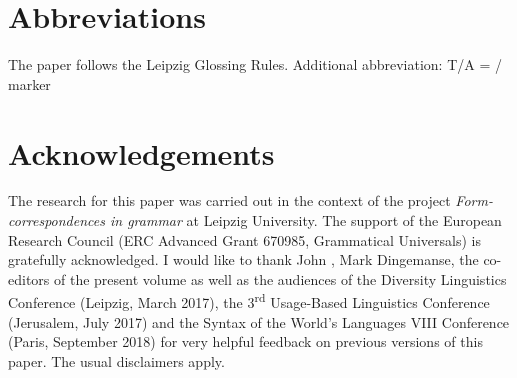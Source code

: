 \documentclass[output=paper]{langsci/langscibook}
\begin{document}
\section*{Abbreviations}

The paper follows the Leipzig Glossing Rules. Additional abbreviation: T/A = / marker

\section*{Acknowledgements}

The research for this paper was carried out in the context of the project \textit{Form- correspondences in grammar} at Leipzig University. The support of the European Research Council (ERC Advanced Grant 670985, Grammatical Universals) is gratefully acknowledged. I would like to thank John , Mark Dingemanse, the co-editors of the present volume as well as the audiences of the Diversity Linguistics Conference (Leipzig,  {March 2017}), the 3\textsuperscript{rd} Usage-Based Linguistics Conference (Jerusalem,  {July 2017}) and the Syntax of the World’s Languages VIII Conference (Paris,  {September 2018}) for very helpful feedback on previous versions of this paper. The usual disclaimers apply.


\sloppy
\printbibliography[heading=subbibliography,notkeyword=this] 
\end{document}
